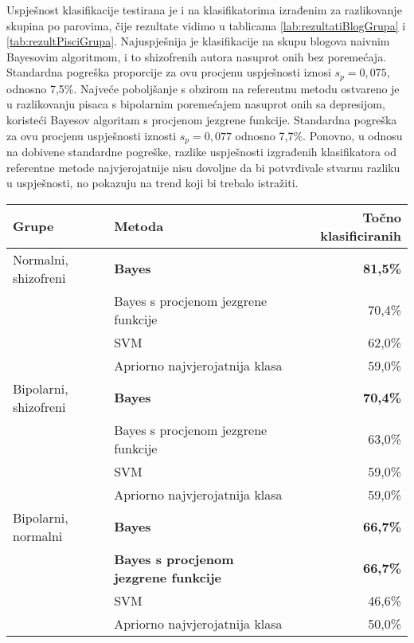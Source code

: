 \documentclass[10pt, a4paper]{article}
\begin{document}
Uspješnost klasifikacije testirana je i na klasifikatorima izrađenim za razlikovanje skupina po parovima, čije rezultate vidimo u tablicama \ref{lab:rezultatiBlogGrupa} i \ref{tab:rezultPisciGrupa}. Najuspješnija je klasifikacije na skupu blogova naivnim Bayesovim algoritmom, i to shizofrenih autora nasuprot onih bez poremećaja. Standardna pogreška proporcije za ovu procjenu uspješnosti iznosi $s_p = 0,075$, odnosno 7,5\%. Najveće poboljšanje s obzirom na referentnu metodu ostvareno je u razlikovanju pisaca s bipolarnim poremećajem nasuprot onih sa depresijom, koristeći Bayesov algoritam s procjenom jezgrene funkcije. Standardna pogreška za ovu procjenu uspješnosti iznosti $s_p = 0,077$ odnosno 7,7\%. Ponovno, u odnosu na dobivene standardne pogreške, razlike uspješnosti izgrađenih klasifikatora od referentne metode najvjerojatnije nisu dovoljne da bi potvrđivale stvarnu razliku u uspješnosti, no pokazuju na trend koji bi trebalo istražiti.

\begin{table*}
\caption{Postotak točno klasificiranih primjera na skupu blogova po parovima klasa korištenjem različitih algoritama.}
\label{lab:rezultatiBlogGrupa}
\begin{center}
\begin{tabular}{llr}
\toprule
Grupe & Metoda & Točno klasificiranih\\
\midrule
Normalni, shizofreni & \textbf{Bayes} & \textbf{81,5\%}\\
 & Bayes s procjenom jezgrene funkcije & 70,4\%\\
 & SVM & 62,0\%\\
 & Apriorno najvjerojatnija klasa & 59,0\%\\
\midrule
 Bipolarni, shizofreni &   \textbf{Bayes} &   \textbf{70,4\%}\\
 & Bayes s procjenom jezgrene funkcije & 63,0\%\\
 & SVM & 59,0\%\\
 & Apriorno najvjerojatnija klasa & 59,0\%\\
\midrule
Bipolarni, normalni & \textbf{Bayes} &  \textbf{66,7\%}\\
 &  \textbf{Bayes s procjenom jezgrene funkcije} &  \textbf{66,7\%}\\
 & SVM & 46,6\%\\
 & Apriorno najvjerojatnija klasa & 50,0\%\\
 \bottomrule
 \end{tabular}
 \end{center}
 \end{table*}
\end{document}
